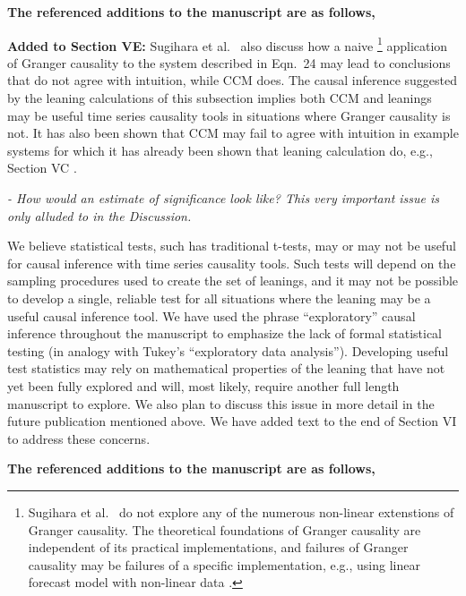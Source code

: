 \documentclass[a4paper,11pt]{article}
\begin{document}
{\bf The referenced additions to the manuscript are as follows,}

{\bf Added to Section VE:} Sugihara et al.\ \cite{Sugihara2012} also discuss how a naive \footnote{Sugihara et al.\ \cite{Sugihara2012} do not explore any of the numerous non-linear extenstions of Granger causality.  The theoretical foundations of Granger causality are independent of its practical implementations, and failures of Granger causality may be failures of a specific implementation, e.g., using linear forecast model with non-linear data \cite{Granger1980}.} application of Granger causality to the system described in Eqn.\ 24 may lead to conclusions that do not agree with intuition, while CCM does.  The causal inference suggested by the leaning calculations of this subsection implies both CCM and leanings may be useful time series causality tools in situations where Granger causality is not.  It has also been shown that CCM may fail to agree with intuition in example systems for which it has already been shown that leaning calculation do, e.g., Section VC \cite{Weigel2014}.

\vspace{0.5cm}
{\em - How would an estimate of significance look like? This very important
issue is only alluded to in the Discussion.}
\vspace{0.5cm}

We believe statistical tests, such has traditional t-tests, may or may not be useful for causal inference with time series causality tools.  Such tests will depend on the sampling procedures used to create the set of leanings, and it may not be possible to develop a single, reliable test for all situations where the leaning may be a useful causal inference tool.  We have used the phrase ``exploratory'' causal inference throughout the manuscript to emphasize the lack of formal statistical testing (in analogy with Tukey's ``exploratory data analysis'').  Developing useful test statistics may rely on mathematical properties of the leaning that have not yet been fully explored and will, most likely, require another full length manuscript to explore.  We also plan to discuss this issue in more detail in the future publication mentioned above.  We have added text to the end of Section VI to address these concerns. 

{\bf The referenced additions to the manuscript are as follows,}
\end{document}
